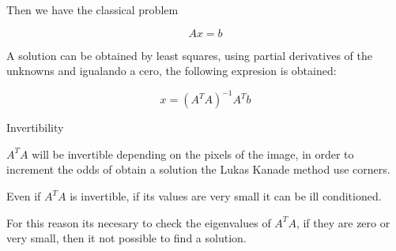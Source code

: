 Then we have the classical problem

$$ 
Ax = b
$$

A solution can be obtained by least squares, using partial derivatives of the unknowns and igualando a cero, the following expresion
 is obtained:

$$
x = (A^T A)^{-1} A^T b
$$

Invertibility 

$A^T A$ will be invertible depending on the pixels of the image, in order to increment the odds of obtain a solution the Lukas Kanade method use corners.

Even if $A^T A $ is invertible, if its values are very small it can be ill conditioned.

For this reason its necesary to check the eigenvalues of $A^T A$, if they are zero or very small, then it not possible to find a solution.




